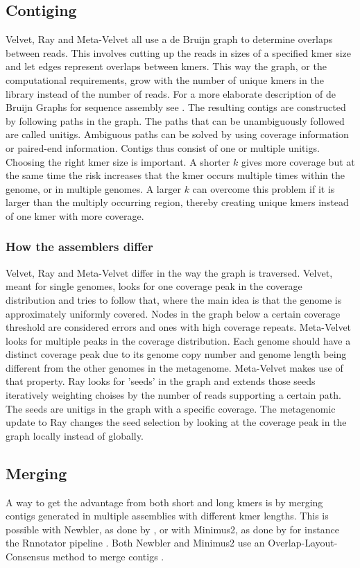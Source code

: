 \documentclass[a4paper,12pt]{report}
\begin{document}
\subsection{Contiging}
Velvet, Ray and Meta-Velvet all use a de Bruijn graph to determine overlaps
between reads. This involves cutting up the reads in sizes of a specified kmer
size and let edges represent overlaps between kmers. This way the graph, or the
computational requirements, grow with the number of unique kmers in the library
instead of the number of reads. For a more elaborate description of de Bruijn
Graphs for sequence assembly see \cite{Miller20211242}. The resulting contigs
are constructed by following paths in the graph. The paths that can be
unambiguously followed are called unitigs. Ambiguous paths can be solved by
using coverage information or paired-end information. Contigs thus consist of
one or multiple unitigs. Choosing the right kmer size is important. A shorter
$k$ gives more coverage but at the same time the risk increases that the kmer
occurs multiple times within the genome, or in multiple genomes. A larger $k$
can overcome this problem if it is larger than the multiply occurring region,
thereby creating unique kmers instead of one kmer with more coverage.\\


\subsubsection{How the assemblers differ}
Velvet, Ray and Meta-Velvet differ in the way the graph is traversed. Velvet,
meant for single genomes, looks for one coverage peak in the coverage
distribution and tries to follow that, where the main idea is that the genome
is approximately uniformly covered. Nodes in the graph below a certain coverage
threshold are considered errors and ones with high coverage repeats.
Meta-Velvet looks for multiple peaks in the coverage distribution. Each genome
should have a distinct coverage peak due to its genome copy number and genome
length being different from the other genomes in the metagenome. Meta-Velvet
makes use of that property. Ray looks for 'seeds' in the graph and extends
those seeds iteratively weighting choises by the number of reads supporting a
certain path. The seeds are unitigs in the graph with a specific coverage. The
metagenomic update to Ray changes the seed selection by looking at the coverage
peak in the graph locally instead of globally. 


\subsection{Merging}
A way to get the advantage from both short and long kmers is by merging contigs
generated in multiple assemblies with different kmer lengths. This is possible
with Newbler, as done by \citet{Luo22347999}, or with Minimus2, as done by for
instance the Rnnotator pipeline \cite{Martin21106091}. Both Newbler and
Minimus2 use an Overlap-Layout-Consensus method to merge contigs
\cite{Sommer17324286,Miller20211242}.
\end{document}
